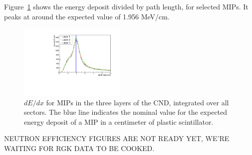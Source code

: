 Figure~\ref{fig_performance_edep} shows the energy deposit divided by path length, for selected MIPs. It peaks at around the expected value of 1.956 MeV/cm.

\begin{figure}[htb]  
\begin{center}
\includegraphics[width=0.45\textwidth]{Figure/canENE.pdf}
\caption {$dE/dx$ for MIPs in the three layers of the CND, integrated over all sectors. The blue line indicates the nominal value for the expected energy deposit of a MIP in a centimeter of plastic scintillator.}
\label{fig_performance_edep}
\end{center}
\end{figure}

NEUTRON EFFICIENCY FIGURES ARE NOT READY YET, WE'RE WAITING FOR RGK DATA TO BE COOKED.
